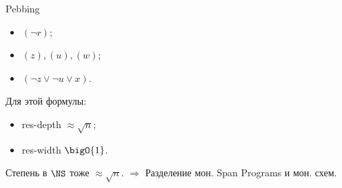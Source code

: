 \begin{frame}{Pebbing}

    \begin{center}
                
    \end{center}

    \pause
    \begin{itemize}
        \item $(\neg r)$;
            \pause
        \item $(z), (u), (w)$;
            \pause
        \item $(\neg z \lor \neg u \lor x)$.    
    \end{itemize}

    \pause
    \begin{lemma}
        Для этой формулы:
        \begin{itemize}
            \item res-depth $\approx \sqrt{n}$;
            \item res-width $\bigO{1}$.
        \end{itemize}
    \end{lemma}

    \pause
    Степень в $\NS$ тоже $\approx \sqrt{n}$. $\Rightarrow$ Разделение мон. Span Programs и мон. схем.
\end{frame}


